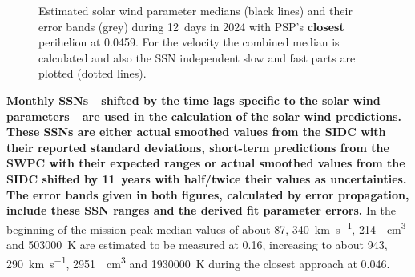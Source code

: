 \begin{figure}
	\caption{Estimated solar wind parameter medians (black lines) and their error bands (grey) during 12~days in 2024 with PSP's \textbf{closest} perihelion at \SI{0.0459}{\au}. For the velocity the combined median is calculated and also the SSN independent slow and fast parts are plotted (dotted lines).}
	\label{fig:SPP_perihelia_prediction_nearest_f_plot}
\end{figure}
\textbf{Monthly SSNs---shifted by the time lags specific to the solar wind parameters---are used in the calculation of the solar wind predictions. These SSNs are either actual smoothed values from the SIDC with their reported standard deviations, short-term predictions from the SWPC with their expected ranges or actual smoothed values from the SIDC shifted by 11~years with half/twice their values as uncertainties. The error bands given in both figures, calculated by error propagation, include these SSN ranges and the derived fit parameter errors.} In the beginning of the mission peak median values of about \SI{87}{\nT}, \SI{340}{\km\per\s}, \SI{214}{\per\cm\cubed} and \SI{503000}{\K} are estimated to be measured at \SI{0.16}{\au}, increasing to about \SI{943}{\nT}, \SI{290}{\km\per\s}, \SI{2951}{\per\cm\cubed} and \SI{1930000}{\K} during the closest approach at \SI{0.046}{\au}.

